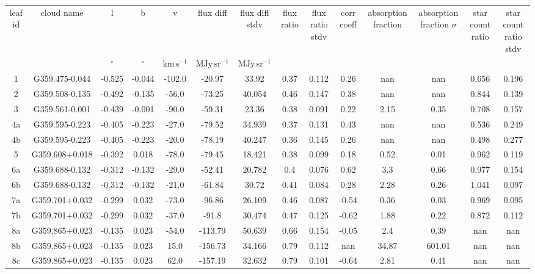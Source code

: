 \begin{table}
\begin{tabular}{cccccccccccccc}
leaf id & cloud name & l & b & v & flux diff & flux diff stdv & flux ratio & flux ratio stdv & corr coeff & absorption fraction & absorption fraction $\sigma$ & star count ratio & star count ratio stdv \\
 &  & $\mathrm{{}^{\circ}}$ & $\mathrm{{}^{\circ}}$ & $\mathrm{km\,s^{-1}}$ & $\mathrm{MJy\,sr^{-1}}$ & $\mathrm{MJy\,sr^{-1}}$ &  &  &  &  &  &  &  \\
1 & G359.475-0.044 & -0.525 & -0.044 & -102.0 & -20.97 & 33.92 & 0.37 & 0.112 & 0.26 & nan & nan & 0.656 & 0.196 \\
2 & G359.508-0.135 & -0.492 & -0.135 & -56.0 & -73.25 & 40.054 & 0.46 & 0.147 & 0.38 & nan & nan & 0.844 & 0.139 \\
3 & G359.561-0.001 & -0.439 & -0.001 & -90.0 & -59.31 & 23.36 & 0.38 & 0.091 & 0.22 & 2.15 & 0.35 & 0.708 & 0.157 \\
4a & G359.595-0.223 & -0.405 & -0.223 & -27.0 & -79.52 & 34.939 & 0.37 & 0.131 & 0.43 & nan & nan & 0.536 & 0.249 \\
4b & G359.595-0.223 & -0.405 & -0.223 & -20.0 & -78.19 & 40.247 & 0.36 & 0.145 & 0.26 & nan & nan & 0.498 & 0.277 \\
5 & G359.608+0.018 & -0.392 & 0.018 & -78.0 & -79.45 & 18.421 & 0.38 & 0.099 & 0.18 & 0.52 & 0.01 & 0.962 & 0.119 \\
6a & G359.688-0.132 & -0.312 & -0.132 & -29.0 & -52.41 & 20.782 & 0.4 & 0.076 & 0.62 & 3.3 & 0.66 & 0.977 & 0.154 \\
6b & G359.688-0.132 & -0.312 & -0.132 & -21.0 & -61.84 & 30.72 & 0.41 & 0.084 & 0.28 & 2.28 & 0.26 & 1.041 & 0.097 \\
7a & G359.701+0.032 & -0.299 & 0.032 & -73.0 & -96.86 & 26.109 & 0.46 & 0.087 & -0.54 & 0.36 & 0.03 & 0.969 & 0.095 \\
7b & G359.701+0.032 & -0.299 & 0.032 & -37.0 & -91.8 & 30.474 & 0.47 & 0.125 & -0.62 & 1.88 & 0.22 & 0.872 & 0.112 \\
8a & G359.865+0.023 & -0.135 & 0.023 & -54.0 & -113.79 & 50.639 & 0.66 & 0.154 & -0.05 & 2.4 & 0.39 & nan & nan \\
8b & G359.865+0.023 & -0.135 & 0.023 & 15.0 & -156.73 & 34.166 & 0.79 & 0.112 & nan & 34.87 & 601.01 & nan & nan \\
8c & G359.865+0.023 & -0.135 & 0.023 & 62.0 & -157.19 & 32.632 & 0.79 & 0.101 & -0.64 & 2.81 & 0.41 & nan & nan \\

\end{tabular}
\end{table}
